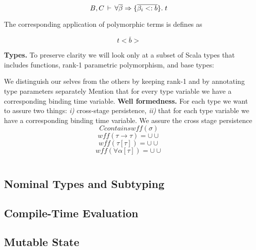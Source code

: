 $$B, C \,\vdash\, \forall \overline{\beta} \Rightarrow \{\overline{\beta_i <: b}\}. \; t$$

The corresponding application of polymorphic terms is defines as

 $$t<\overline{b}>$$

{\bf Types.} To preserve clarity we will look only at a subset of Scala types that includes functions, rank-1 parametric polymorphism, and base types:

We distinguish our selves from the others by keeping rank-1 and by annotating type parameters separately
Mention that for every type variable we have a corresponding binding time variable.
{\bf Well formedness.} For each type we want to assure two things: \emph{i)} cross-stage persistence, \emph{ii)} that for each type variable we have a corresponding binding time variable. We assure the cross stage persistence
$$C contains wff(\sigma)$$
$$wff(\tau \rightarrow \tau) = \cup \cup$$
$$wff(\tau[\tau]) = \cup \cup$$
$$wff(\forall\alpha[\tau]) = \cup \cup$$

$$$$





\subsection{Nominal Types and Subtyping}
\label{sct:nominal-types}

\subsection{Compile-Time Evaluation}
\label{sct:evaluation}

\subsection{Mutable State}
\label{sct:mutable-state}
